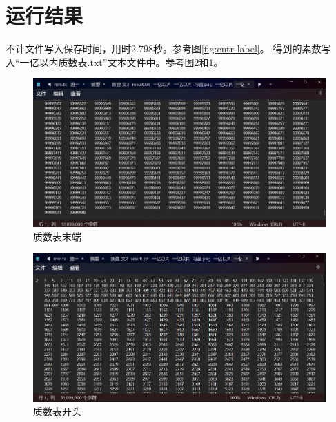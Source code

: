 \documentclass[UTF8]{ctexart}
\begin{document}
\section{运行结果}
不计文件写入保存时间，用时2.798秒。参考图\ref{fig:entr-label}。
得到的素数写入“一亿以内质数表.txt”文本文件中。参考图\ref{fig:ener-label}和\ref{fig:ente-label}。
\begin{figure}
    \centering
    \includegraphics[width=1\linewidth]{im.png}
    \caption{质数表末端}
    \label{fig:ente-label}
\end{figure}
\begin{figure}
    \centering
    \includegraphics[width=1\linewidth]{image.png}
    \caption{质数表开头}
    \label{fig:ener-label}
\end{figure}
\end{document}
